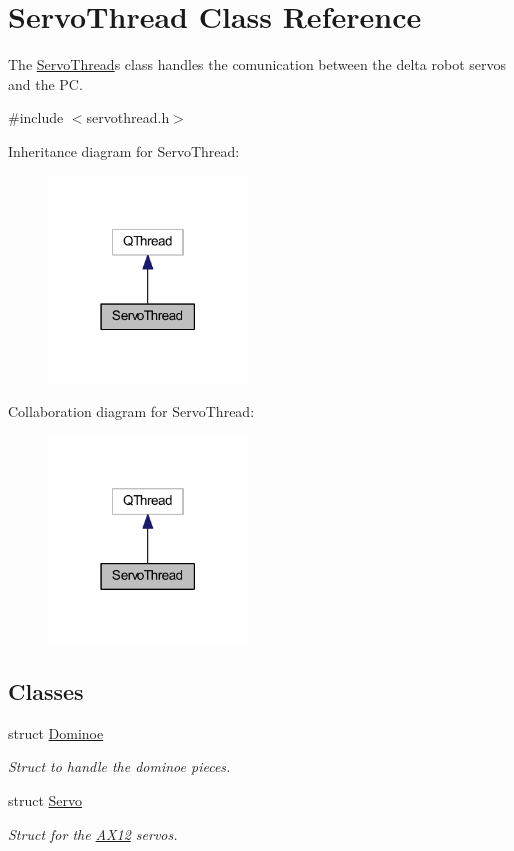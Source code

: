 \hypertarget{a00009}{}\section{Servo\+Thread Class Reference}
\label{a00009}


The \hyperlink{a00009}{Servo\+Thread}\textquotesingle{}s class handles the comunication between the delta robot servos and the P\+C.  




{\ttfamily \#include $<$servothread.\+h$>$}



Inheritance diagram for Servo\+Thread\+:
\nopagebreak
\begin{figure}[H]
\begin{center}
\leavevmode
\includegraphics[width=150pt]{d6/d42/a00043}
\end{center}
\end{figure}


Collaboration diagram for Servo\+Thread\+:
\nopagebreak
\begin{figure}[H]
\begin{center}
\leavevmode
\includegraphics[width=150pt]{d5/df9/a00044}
\end{center}
\end{figure}
\subsection*{Classes}
\begin{DoxyCompactItemize}
\item 
struct \hyperlink{a00002}{Dominoe}
\begin{DoxyCompactList}\small\item\em Struct to handle the dominoe pieces. \end{DoxyCompactList}\item 
struct \hyperlink{a00007}{Servo}
\begin{DoxyCompactList}\small\item\em Struct for the \hyperlink{a00001}{A\+X12} servos. \end{DoxyCompactList}\end{DoxyCompactItemize}
